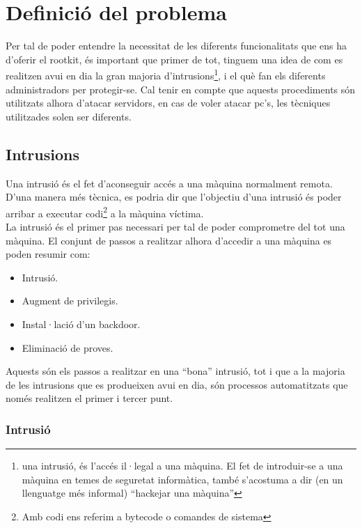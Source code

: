 \chapter{Definició del problema}

Per tal de poder entendre la necessitat de les diferents funcionalitats que ens ha d'oferir el rootkit,
és important que primer de tot, tinguem una idea de com es realitzen avui en dia la gran majoria
d'intrusions\footnote{una intrusió, és l'accés il·legal a una màquina. El fet de introduir-se a una màquina
en temes de seguretat informàtica, també s'acostuma a dir (en un llenguatge més informal) ``hackejar una màquina''},
i el què fan els diferents administradors per protegir-se. Cal tenir en compte que aquests procediments són 
utilitzats alhora d'atacar servidors, en cas de voler atacar pc's, les tècniques utilitzades solen ser diferents.

\section{Intrusions}

Una intrusió és el fet d'aconseguir accés a una màquina normalment remota. D'una manera més tècnica, es podria dir
que l'objectiu d'una intrusió és poder arribar a executar codi\footnote{Amb codi ens referim a bytecode o comandes de sistema} 
a la màquina víctima. \\

La intrusió és el primer pas necessari per tal de poder comprometre del tot una màquina. El conjunt de passos a 
realitzar alhora d'accedir a una màquina es poden resumir com:

\begin{itemize}
\item Intrusió.
\item Augment de privilegis.
\item Instal·lació d'un backdoor.
\item Eliminació de proves.
\end{itemize}

Aquests són els passos a realitzar en una ``bona'' intrusió, tot i que a la majoria de les intrusions que es produeixen
avui en dia, són processos automatitzats que només realitzen el primer i tercer punt.

\subsection{Intrusió}

